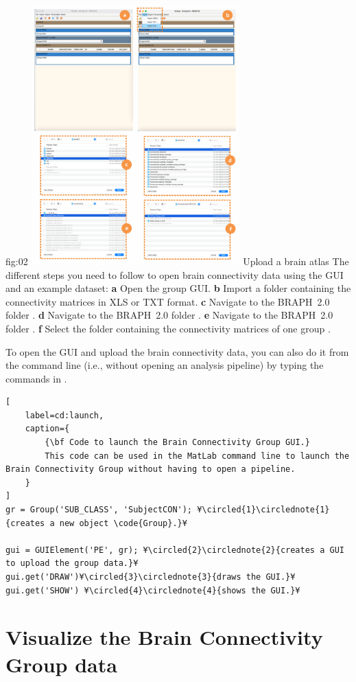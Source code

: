 \documentclass[justified]{tufte-handout}
\begin{document}
	{fig:02}
	{
	\includegraphics[height=10cm]{fig02.png}
	}
	{Upload a brain atlas}
	{
	The different steps you need to follow to open brain connectivity data using the GUI and an example dataset: 
	{\bf a} Open the group GUI.
	{\bf b} Import a folder containing the connectivity matrices in XLS or TXT format.
	{\bf c} Navigate to the BRAPH~2.0 folder .
	{\bf d} Navigate to the BRAPH~2.0 folder .
	{\bf e} Navigate to the BRAPH~2.0 folder .
	{\bf f} Select the folder containing the connectivity matrices of one group .
	}

To open the GUI and upload the brain connectivity data, you can also do it from the command line (i.e., without opening an analysis pipeline) by typing the commands in .
%
\begin{lstlisting}[
	label=cd:launch,
	caption={
		{\bf Code to launch the Brain Connectivity Group GUI.}
		This code can be used in the MatLab command line to launch the Brain Connectivity Group without having to open a pipeline.
	}
]
gr = Group('SUB_CLASS', 'SubjectCON'); ¥\circled{1}\circlednote{1}{creates a new object \code{Group}.}¥

gui = GUIElement('PE', gr); ¥\circled{2}\circlednote{2}{creates a GUI to upload the group data.}¥
gui.get('DRAW')¥\circled{3}\circlednote{3}{draws the GUI.}¥
gui.get('SHOW') ¥\circled{4}\circlednote{4}{shows the GUI.}¥
\end{lstlisting}

\clearpage
\section{Visualize the Brain Connectivity Group data}
\end{document}

